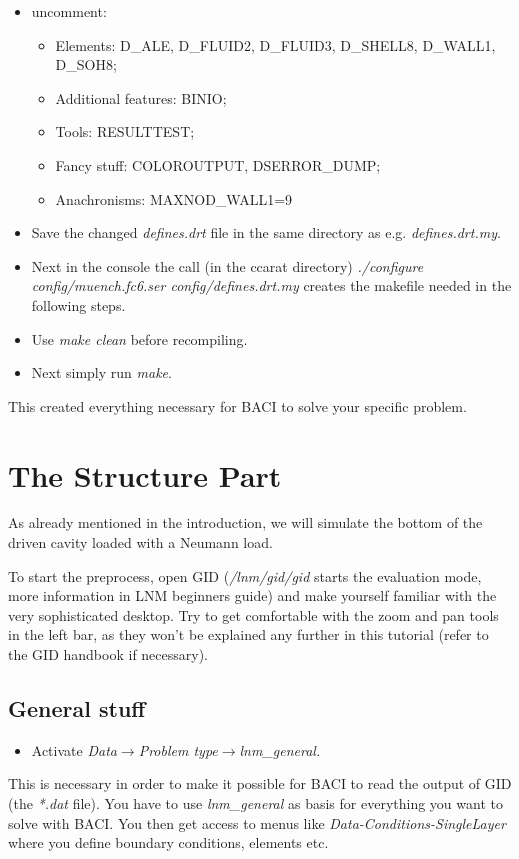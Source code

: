 \begin{itemize}
\item uncomment:

\begin{itemize}
\item Elements: D\_ALE, D\_FLUID2, D\_FLUID3, D\_SHELL8, D\_WALL1, D\_SOH8;
\item Additional features: BINIO;
\item Tools: RESULTTEST;
\item Fancy stuff: COLOROUTPUT, DSERROR\_DUMP;
\item Anachronisms: MAXNOD\_WALL1=9
\end{itemize}
\item Save the changed \emph{defines.drt} file in the same directory as e.g.
\emph{defines.drt.my}. 
\item Next in the console the call (in the ccarat directory) \emph{./configure
config/muench.fc6.ser config/defines.drt.my} creates the makefile needed
in the following steps. 
\item Use \emph{make clean} before recompiling. 
\item Next simply run \emph{make}.
\end{itemize}
This created everything necessary for BACI to solve your specific
problem.


\section{The Structure Part}

As already mentioned in the introduction, we will simulate the bottom
of the driven cavity loaded with a Neumann load.

To start the preprocess, open GID (\emph{/lnm/gid/gid} starts the evaluation 
mode, more information in LNM beginners guide) and make yourself familiar with
the very sophisticated desktop. Try to get comfortable with the zoom
and pan tools in the left bar, as they won't be explained any further
in this tutorial (refer to the GID handbook if necessary).


\subsection{General stuff}

\begin{itemize}
\item Activate \emph{Data$\to$Problem type$\to$lnm\_general.}
\end{itemize}
This is necessary in order to make it possible for BACI to read the
output of GID (the \emph{{*}.dat} file). You have to use \emph{lnm\_general}
as basis for everything you want to solve with BACI. You then get
access to menus like \emph{Data-Conditions-SingleLayer} where you
define boundary conditions, elements etc.


